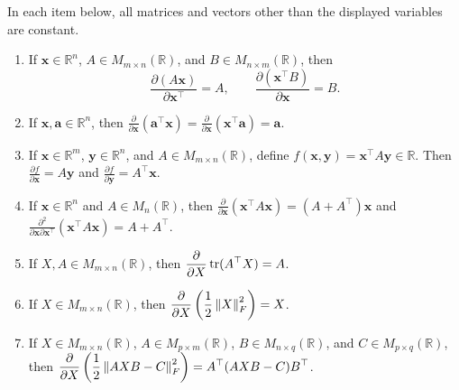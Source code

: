 \begin{theorem}
In each item below, all matrices and vectors other than the displayed variables
are constant.
\begin{enumerate}
    \item If $\mathbf{x}\in\mathbb{R}^n$,
    $A\in M_{m\times n}(\mathbb{R})$, and
    $B\in M_{n\times m}(\mathbb{R})$, then
    \[
        \frac{\partial(A\mathbf{x})}{\partial\mathbf{x}^{\top}}=A,
        \qquad
        \frac{\partial(\mathbf{x}^{\top}B)}{\partial\mathbf{x}}=B.
    \]

    \item If $\mathbf{x},\mathbf{a}\in\mathbb{R}^n$, then
    $\displaystyle
    \frac{\partial}{\partial\mathbf{x}}(\mathbf{a}^{\top}\mathbf{x})
    =\frac{\partial}{\partial\mathbf{x}}(\mathbf{x}^{\top}\mathbf{a})
    =\mathbf{a}$.

    \item If $\mathbf{x}\in\mathbb{R}^m$,
    $\mathbf{y}\in\mathbb{R}^n$, and
    $A\in M_{m\times n}(\mathbb{R})$, define
    $f(\mathbf{x},\mathbf{y})=\mathbf{x}^{\top}A\mathbf{y}\in\mathbb{R}$.
    Then
    $\frac{\partial f}{\partial\mathbf{x}}=A\mathbf{y}$
    and $\frac{\partial f}{\partial\mathbf{y}}=A^{\top}\mathbf{x}$.

    \item If $\mathbf{x}\in\mathbb{R}^n$ and $A\in M_n(\mathbb{R})$, then
    $\displaystyle
    \frac{\partial}{\partial\mathbf{x}}(\mathbf{x}^{\top}A\mathbf{x})
    =(A+A^{\top})\mathbf{x}$ and
    $\displaystyle
    \frac{\partial^2}{\partial\mathbf{x}\partial\mathbf{x}^{\top}}
    (\mathbf{x}^{\top}A\mathbf{x})=A+A^{\top}$.

    \item If $X,A\in M_{m\times n}(\mathbb{R})$, then
    $\displaystyle \frac{\partial}{\partial X}\operatorname{tr}(A^{\top}X)=A$.

    \item If $X\in M_{m\times n}(\mathbb{R})$, then
    $\displaystyle
    \frac{\partial}{\partial X}\left(\frac{1}{2}\left\lVert X \right\rVert_F^2\right)=X$.

    \item If $X\in M_{m\times n}(\mathbb{R})$,
    $A\in M_{p\times m}(\mathbb{R})$,
    $B\in M_{n\times q}(\mathbb{R})$, and
    $C\in M_{p\times q}(\mathbb{R})$, then
    $\displaystyle
    \frac{\partial}{\partial X}\left(\frac{1}{2}\left\lVert AXB-C \right\rVert_F^2\right)
    =A^{\top}(AXB-C)B^{\top}$.

\end{enumerate}
\end{theorem}

